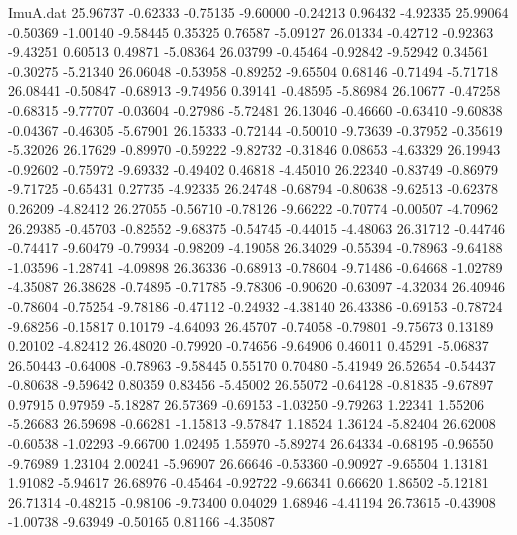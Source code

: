 \begin{filecontents}{ImuA.dat}
  25.96737   -0.62333   -0.75135   -9.60000   -0.24213    0.96432   -4.92335
  25.99064   -0.50369   -1.00140   -9.58445    0.35325    0.76587   -5.09127
  26.01334   -0.42712   -0.92363   -9.43251    0.60513    0.49871   -5.08364
  26.03799   -0.45464   -0.92842   -9.52942    0.34561   -0.30275   -5.21340
  26.06048   -0.53958   -0.89252   -9.65504    0.68146   -0.71494   -5.71718
  26.08441   -0.50847   -0.68913   -9.74956    0.39141   -0.48595   -5.86984
  26.10677   -0.47258   -0.68315   -9.77707   -0.03604   -0.27986   -5.72481
  26.13046   -0.46660   -0.63410   -9.60838   -0.04367   -0.46305   -5.67901
  26.15333   -0.72144   -0.50010   -9.73639   -0.37952   -0.35619   -5.32026
  26.17629   -0.89970   -0.59222   -9.82732   -0.31846    0.08653   -4.63329
  26.19943   -0.92602   -0.75972   -9.69332   -0.49402    0.46818   -4.45010
  26.22340   -0.83749   -0.86979   -9.71725   -0.65431    0.27735   -4.92335
  26.24748   -0.68794   -0.80638   -9.62513   -0.62378    0.26209   -4.82412
  26.27055   -0.56710   -0.78126   -9.66222   -0.70774   -0.00507   -4.70962
  26.29385   -0.45703   -0.82552   -9.68375   -0.54745   -0.44015   -4.48063
  26.31712   -0.44746   -0.74417   -9.60479   -0.79934   -0.98209   -4.19058
  26.34029   -0.55394   -0.78963   -9.64188   -1.03596   -1.28741   -4.09898
  26.36336   -0.68913   -0.78604   -9.71486   -0.64668   -1.02789   -4.35087
  26.38628   -0.74895   -0.71785   -9.78306   -0.90620   -0.63097   -4.32034
  26.40946   -0.78604   -0.75254   -9.78186   -0.47112   -0.24932   -4.38140
  26.43386   -0.69153   -0.78724   -9.68256   -0.15817    0.10179   -4.64093
  26.45707   -0.74058   -0.79801   -9.75673    0.13189    0.20102   -4.82412
  26.48020   -0.79920   -0.74656   -9.64906    0.46011    0.45291   -5.06837
  26.50443   -0.64008   -0.78963   -9.58445    0.55170    0.70480   -5.41949
  26.52654   -0.54437   -0.80638   -9.59642    0.80359    0.83456   -5.45002
  26.55072   -0.64128   -0.81835   -9.67897    0.97915    0.97959   -5.18287
  26.57369   -0.69153   -1.03250   -9.79263    1.22341    1.55206   -5.26683
  26.59698   -0.66281   -1.15813   -9.57847    1.18524    1.36124   -5.82404
  26.62008   -0.60538   -1.02293   -9.66700    1.02495    1.55970   -5.89274
  26.64334   -0.68195   -0.96550   -9.76989    1.23104    2.00241   -5.96907
  26.66646   -0.53360   -0.90927   -9.65504    1.13181    1.91082   -5.94617
  26.68976   -0.45464   -0.92722   -9.66341    0.66620    1.86502   -5.12181
  26.71314   -0.48215   -0.98106   -9.73400    0.04029    1.68946   -4.41194
  26.73615   -0.43908   -1.00738   -9.63949   -0.50165    0.81166   -4.35087

\end{filecontents}
